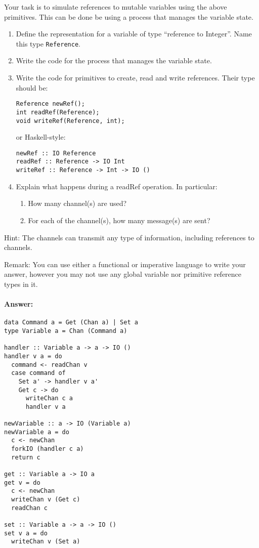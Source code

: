 \documentclass{article}
\newcommand{\answer}[0]{\paragraph{Answer:}}
\begin{document}
Your task is to simulate references to mutable variables using the
above primitives. This can be done be using a process that manages the
variable state.

\begin{enumerate}
\item Define the representation for a variable of type ``reference to
  Integer''. Name this type \texttt{Reference}. 
\item Write the code for the process that manages the variable state. 
\item Write the code for primitives to create, read and write references. 
Their type should be:
\begin{verbatim}
Reference newRef();
int readRef(Reference);
void writeRef(Reference, int);
\end{verbatim}
or Haskell-style:
\begin{verbatim}
newRef :: IO Reference
readRef :: Reference -> IO Int
writeRef :: Reference -> Int -> IO ()
\end{verbatim}
\item Explain what happens during a readRef operation. In particular:
  \begin{enumerate}
  \item How many channel(s) are used? 
  \item For each of the channel(s), how many message(s) are sent?  
  \end{enumerate}
\end{enumerate}

Hint: The channels can transmit any type of information, including
references to channels.

Remark: You can use either a functional or imperative language to
write your answer, however you may not use any global variable nor
primitive reference types in it.

\answer{
\begin{verbatim}    
data Command a = Get (Chan a) | Set a
type Variable a = Chan (Command a)

handler :: Variable a -> a -> IO ()
handler v a = do
  command <- readChan v
  case command of
    Set a' -> handler v a'
    Get c -> do 
      writeChan c a
      handler v a

newVariable :: a -> IO (Variable a)
newVariable a = do
  c <- newChan
  forkIO (handler c a)
  return c

get :: Variable a -> IO a
get v = do
  c <- newChan
  writeChan v (Get c)
  readChan c
  
set :: Variable a -> a -> IO ()
set v a = do
  writeChan v (Set a)
\end{verbatim}
}
\end{document}
